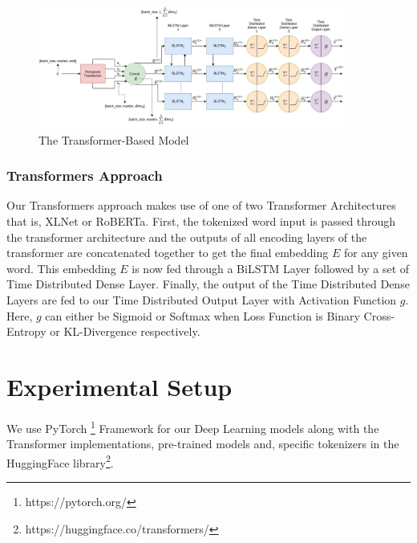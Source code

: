 \documentclass[letterpaper]{article} %
\begin{document}
\begin{figure}[t]
\centering
\includegraphics[width=0.9\textwidth]{TRANSFORMER_MODEL.jpg} %
\caption{The Transformer-Based Model}
\label{The Transformer-Based Model}
\end{figure}

\subsubsection{Transformers Approach}
Our Transformers approach makes use of one of two Transformer Architectures that is, XLNet or RoBERTa. First, the tokenized word input is passed through the transformer architecture and the outputs of all encoding layers of the transformer are concatenated together to get the final embedding $E$ for any given word. This embedding $E$ is now fed through a BiLSTM Layer followed by a set of Time Distributed Dense Layer. Finally, the output of the Time Distributed Dense Layers are fed to our Time Distributed Output Layer with Activation Function $g$. Here, $g$ can either be Sigmoid or Softmax when Loss Function is Binary Cross-Entropy or KL-Divergence respectively.

\section{Experimental Setup}
We use PyTorch \footnote{https://pytorch.org/} Framework for our Deep Learning models along with the Transformer implementations, pre-trained models and, specific tokenizers in the HuggingFace library\footnote{https://huggingface.co/transformers/}.\\
\end{document}
